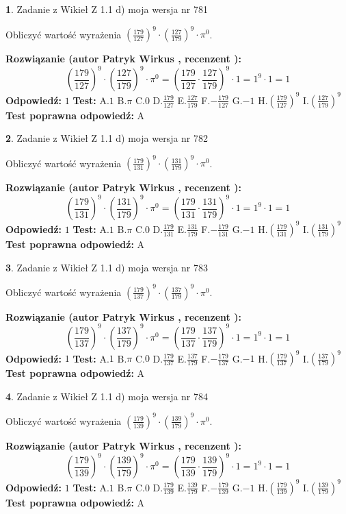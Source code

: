 \documentclass[12pt, a4paper]{article}
\theoremstyle{definition} %
\newtheorem{zad}{}
\newcommand{\zadStart}[1]{\begin{zad}#1\newline}
\newcommand{\zadStop}{\end{zad}}
\newcommand{\rozwStart}[2]{\noindent \textbf{Rozwiązanie (autor #1 , recenzent #2): }\newline}
\newcommand{\rozwStop}{\newline}
\newcommand{\odpStart}{\noindent \textbf{Odpowiedź:}\newline}
\newcommand{\odpStop}{\newline}
\newcommand{\testStart}{\noindent \textbf{Test:}\newline}
\newcommand{\testStop}{\newline}
\newcommand{\kluczStart}{\noindent \textbf{Test poprawna odpowiedź:}\newline}
\newcommand{\kluczStop}{\newline}
\begin{document}
\zadStart{Zadanie z Wikieł Z 1.1 d) moja wersja nr 781}

Obliczyć wartość wyrażenia $(\frac{179}{127})^{9} \cdot (\frac{127}{179})^{9} \cdot \pi^{0}$.
\zadStop
\rozwStart{Patryk Wirkus}{}
$$(\frac{179}{127})^{9} \cdot (\frac{127}{179})^{9} \cdot \pi^{0} = (\frac{179}{127} \cdot \frac{127}{179})^{9} \cdot 1 = 1^{9} \cdot 1 = 1$$
\rozwStop
\odpStart
$1$
\odpStop
\testStart
A.$1$ B.$\pi$ C.$0$ D.$\frac{179}{127}$ E.$\frac{127}{179}$
F.$-\frac{179}{127}$ G.$-1$
H.$(\frac{179}{127})^{9}$
I.$(\frac{127}{179})^{9}$
\testStop
\kluczStart
A
\kluczStop



\zadStart{Zadanie z Wikieł Z 1.1 d) moja wersja nr 782}

Obliczyć wartość wyrażenia $(\frac{179}{131})^{9} \cdot (\frac{131}{179})^{9} \cdot \pi^{0}$.
\zadStop
\rozwStart{Patryk Wirkus}{}
$$(\frac{179}{131})^{9} \cdot (\frac{131}{179})^{9} \cdot \pi^{0} = (\frac{179}{131} \cdot \frac{131}{179})^{9} \cdot 1 = 1^{9} \cdot 1 = 1$$
\rozwStop
\odpStart
$1$
\odpStop
\testStart
A.$1$ B.$\pi$ C.$0$ D.$\frac{179}{131}$ E.$\frac{131}{179}$
F.$-\frac{179}{131}$ G.$-1$
H.$(\frac{179}{131})^{9}$
I.$(\frac{131}{179})^{9}$
\testStop
\kluczStart
A
\kluczStop



\zadStart{Zadanie z Wikieł Z 1.1 d) moja wersja nr 783}

Obliczyć wartość wyrażenia $(\frac{179}{137})^{9} \cdot (\frac{137}{179})^{9} \cdot \pi^{0}$.
\zadStop
\rozwStart{Patryk Wirkus}{}
$$(\frac{179}{137})^{9} \cdot (\frac{137}{179})^{9} \cdot \pi^{0} = (\frac{179}{137} \cdot \frac{137}{179})^{9} \cdot 1 = 1^{9} \cdot 1 = 1$$
\rozwStop
\odpStart
$1$
\odpStop
\testStart
A.$1$ B.$\pi$ C.$0$ D.$\frac{179}{137}$ E.$\frac{137}{179}$
F.$-\frac{179}{137}$ G.$-1$
H.$(\frac{179}{137})^{9}$
I.$(\frac{137}{179})^{9}$
\testStop
\kluczStart
A
\kluczStop



\zadStart{Zadanie z Wikieł Z 1.1 d) moja wersja nr 784}

Obliczyć wartość wyrażenia $(\frac{179}{139})^{9} \cdot (\frac{139}{179})^{9} \cdot \pi^{0}$.
\zadStop
\rozwStart{Patryk Wirkus}{}
$$(\frac{179}{139})^{9} \cdot (\frac{139}{179})^{9} \cdot \pi^{0} = (\frac{179}{139} \cdot \frac{139}{179})^{9} \cdot 1 = 1^{9} \cdot 1 = 1$$
\rozwStop
\odpStart
$1$
\odpStop
\testStart
A.$1$ B.$\pi$ C.$0$ D.$\frac{179}{139}$ E.$\frac{139}{179}$
F.$-\frac{179}{139}$ G.$-1$
H.$(\frac{179}{139})^{9}$
I.$(\frac{139}{179})^{9}$
\testStop
\kluczStart
A
\kluczStop
\end{document}

